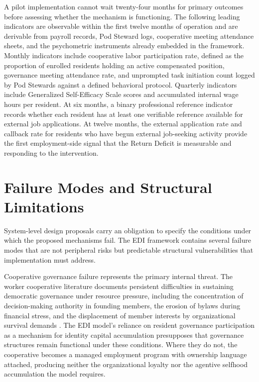\documentclass[12pt, letterpaper]{article}
\begin{document}
A pilot implementation cannot wait twenty-four months for primary outcomes before assessing whether the mechanism is functioning. The following leading indicators are observable within the first twelve months of operation and are derivable from payroll records, Pod Steward logs, cooperative meeting attendance sheets, and the psychometric instruments already embedded in the framework. Monthly indicators include cooperative labor participation rate, defined as the proportion of enrolled residents holding an active compensated position, governance meeting attendance rate, and unprompted task initiation count logged by Pod Stewards against a defined behavioral protocol. Quarterly indicators include Generalized Self-Efficacy Scale scores and accumulated internal wage hours per resident. At six months, a binary professional reference indicator records whether each resident has at least one verifiable reference available for external job applications. At twelve months, the external application rate and callback rate for residents who have begun external job-seeking activity provide the first employment-side signal that the Return Deficit is measurable and responding to the intervention.

\section{Failure Modes and Structural Limitations}

System-level design proposals carry an obligation to specify the conditions under which the proposed mechanisms fail. The EDI framework contains several failure modes that are not peripheral risks but predictable structural vulnerabilities that implementation must address.

Cooperative governance failure represents the primary internal threat. The worker cooperative literature documents persistent difficulties in sustaining democratic governance under resource pressure, including the concentration of decision-making authority in founding members, the erosion of bylaws during financial stress, and the displacement of member interests by organizational survival demands \citep{cornforth1995patterns}. The EDI model's reliance on resident governance participation as a mechanism for identity capital accumulation presupposes that governance structures remain functional under these conditions. Where they do not, the cooperative becomes a managed employment program with ownership language attached, producing neither the organizational loyalty nor the agentive selfhood accumulation the model requires.
\end{document}
